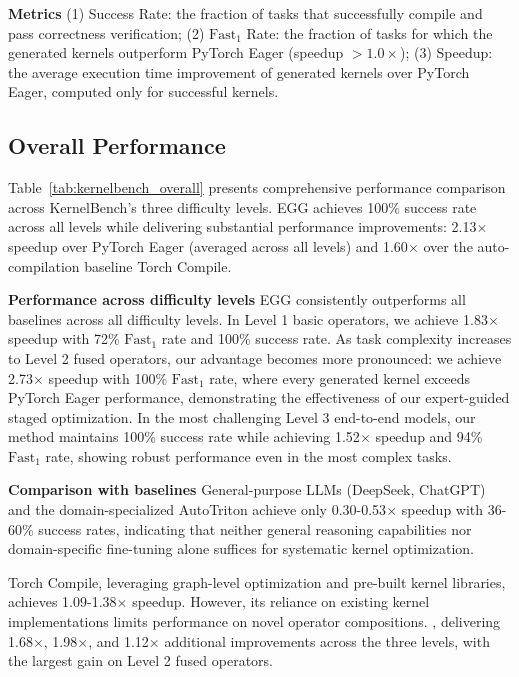 \documentclass{article}
\theoremstyle{plain}
\theoremstyle{definition}
\theoremstyle{remark}
\begin{document}
\textbf{Metrics}
(1) Success Rate: the fraction of tasks that successfully compile and pass correctness verification;
(2) $\mathrm{Fast}_1$ Rate: the fraction of tasks for which the generated kernels outperform PyTorch Eager (speedup $>1.0\times$);
(3) Speedup: the average execution time improvement of generated kernels over PyTorch Eager, computed only for successful kernels.

\subsection{Overall Performance}

Table~\ref{tab:kernelbench_overall} presents comprehensive performance comparison across KernelBench's three difficulty levels. EGG achieves 100\% success rate across all levels while delivering substantial performance improvements: 2.13$\times$ speedup over PyTorch Eager (averaged across all levels) and 1.60$\times$ over the auto-compilation baseline Torch Compile.

\textbf{Performance across difficulty levels} EGG consistently outperforms all baselines across all difficulty levels. In Level 1 basic operators,  we achieve 1.83$\times$ speedup with 72\% $\mathrm{Fast}_1$ rate and 100\% success rate. As task complexity increases to Level 2 fused operators, our advantage becomes more pronounced: we achieve 2.73$\times$ speedup with 100\% $\mathrm{Fast}_1$ rate, where every generated kernel exceeds PyTorch Eager performance, demonstrating the effectiveness of our expert-guided staged optimization. In the most challenging Level 3 end-to-end models, our method maintains 100\% success rate while achieving 1.52$\times$ speedup and 94\% $\mathrm{Fast}_1$ rate, showing robust performance even in the most complex tasks.

\textbf{Comparison with baselines} General-purpose LLMs (DeepSeek, ChatGPT) and the domain-specialized AutoTriton achieve only 0.30-0.53$\times$ speedup with 36-60\% success rates, indicating that neither general reasoning capabilities nor domain-specific fine-tuning alone suffices for systematic kernel optimization.

Torch Compile, leveraging graph-level optimization and pre-built kernel libraries, achieves 1.09-1.38$\times$ speedup. However, its reliance on existing kernel implementations limits performance on novel operator compositions. , delivering 1.68$\times$, 1.98$\times$, and 1.12$\times$ additional improvements across the three levels, with the largest gain on Level 2 fused operators.
\end{document}
